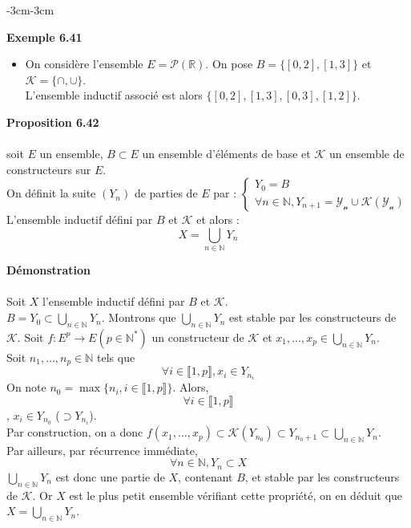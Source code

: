 \documentclass{article}
\newenvironment{exemple}[2]
{
    \begin{boite_exemple}
    \textbf{\textcolor{bleu_fonce}{Exemple #1}} \textit{#2} \\
    \begin{itemize}[label=$\blacktriangleright \quad $]                    
}
{   
    \end{itemize}
    \end{boite_exemple}
    \vspace{15pt}
}
\newenvironment{proposition}[2]
{
    \begin{boite_proposition}
    \textbf{\textcolor{rouge_fonce}{Proposition #1}} \textit{#2} \\ \\
}
{
    \end{boite_proposition}
    \vspace{15pt}
}
\newenvironment{demonstration}
{
    \begin{boite_demonstration}
    \textbf{\textcolor{rouge_fonce}{Démonstration}}\\ \\
}
{
    \end{boite_demonstration}
    \vspace{15pt}
}
\begin{document}
\begin{adjustwidth}{-3cm}{-3cm}
        \begin{exemple}{6.41}{}
            \item On considère l'ensemble $E = \mathcal{P}(\mathbb{R})$. On pose $B = \{[0,2],[1,3]\}$ et $\mathcal{K} = \{\cap, \cup \}$. \\ L'ensemble inductif associé est alors $\{[0,2], [1,3], [0,3], [1,2]\}$.
        \end{exemple}

        \begin{proposition}{6.42}{}
            soit $E$ un ensemble, $B \subset E$ un ensemble d'éléments de base et $\mathcal{K}$ un ensemble de constructeurs sur $E$. \\ On définit la suite $(Y_n)$ de parties de $E$ par : $\begin{cases}
                Y_0 = B \\
                \forall n \in \mathbb{N}, Y_{n+1} = \mathcal{Y_n \cup \mathcal{K}(Y_n)}
            \end{cases}$
            L'ensemble inductif défini par $B$ et $\mathcal{K}$ et alors : $$X = \bigcup_{n \in \mathbb{N}}Y_n$$
        \end{proposition}

        \begin{demonstration}
            Soit $X$ l'ensemble inductif défini par $B$ et $\mathcal{K}$. \\ $B = Y_0 \subset \bigcup_{n \in \mathbb{N}}Y_n$. Montrons que $\bigcup_{n \in \mathbb{N}}Y_n$ est stable par les constructeurs de $\mathcal{K}$. Soit $f:E^p \rightarrow E (p \in \mathbb{N}^*)$ un constructeur de $\mathcal{K}$ et $x_1, \ldots, x_p \in \bigcup_{n \in \mathbb{N}}Y_n$. \\ Soit $n_1, \ldots, n_p \in \mathbb{N}$ tels que $$\forall i \in \llbracket 1,p \rrbracket, x_i \in Y_{n_i} $$ On note $n_0 = \max\{n_i, i \in \llbracket 1,p \rrbracket\}$. Alors, $$\forall i \in \llbracket 1,p \rrbracket$$, $x_i \in Y_{n_0}$ ($\supset Y_{n_i}$). \\ Par construction, on a donc $f(x_1,\ldots,x_p) \subset \mathcal{K}(Y_{n_0}) \subset Y_{n_0 + 1} \subset \bigcup_{n \in \mathbb{N}}Y_n$.\\ Par ailleurs, par récurrence immédiate, $$\forall n \in \mathbb{N}, Y_n \subset X$$ $\bigcup_{n \in \mathbb{N}}Y_n$ est donc une partie de $X$, contenant $B$, et stable par les constructeurs de $\mathcal{K}$. Or $X$ est le plus petit ensemble vérifiant cette propriété, on en déduit que $X = \bigcup_{n \in \mathbb{N}}Y_n$.
        \end{demonstration}


\end{adjustwidth}
\end{document}
